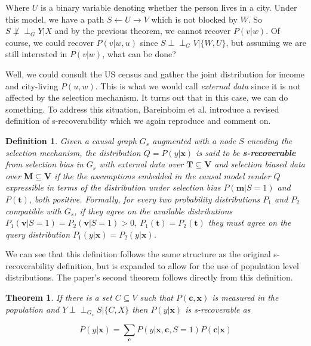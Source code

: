 \documentclass[12pt]{article}
\newtheorem{theorem}{Theorem}
\newtheorem{definition}{Definition}[section]
\theoremstyle{definition}
\newcommand{\dsep}{\perp \!\!\!\perp}
\begin{document}
Where $U$ is a binary variable denoting whether the person lives in a city. Under this model, we have a path $S \leftarrow U \rightarrow V$ which is not blocked by $W$. So $S \not \dsep_G Y | X$ and by the previous theorem, we cannot recover $P(v|w)$. Of course, we could recover $P(v | w, u)$ since $S \dsep_G V | \{W,U\}$, but assuming we are still interested in $P(v|w)$, what can be done? 

Well, we could consult the US census and gather the  joint distribution for income and city-living $P(u, w)$. This is what we would call \emph{external data} since it is not affected by the selection mechanism. It turns out that in this case, we can do something. To address this situation, Bareinboim et al.  introduce a revised definition  of s-recoverability which we again reproduce and comment on. 
 
\begin{definition}
Given a causal graph $G_s$ augmented with a node $S$ encoding the selection mechanism, the distribution $Q = P(y | \mathbf{x})$ is said to be \textbf{s-recoverable} from selection bias in $G_s$ with external data over $\mathbf{T} \subseteq \mathbf{V}$ and selection biased data over $\mathbf{M} \subseteq \mathbf{V}$ if the the assumptions embedded in the causal model render $Q$ expressible in terms of the distribution under selection bias $P(\mathbf{m} | S = 1)$ and $P(\mathbf{t})$, both positive. Formally, for every two probability distributions $P_1$ and $P_2$ compatible with $G_s$, if they agree on the available distributions $P_1(\mathbf{v} | S = 1) = P_2(\mathbf{v} | S = 1) > 0$, $P_1(\mathbf{t}) = P_2(\mathbf{t})$ they must agree on the query distribution $P_1(y | \mathbf{x}) = P_2(y | \mathbf{x})$.
\end{definition}

We can see that this definition follows the same structure as the original s-recoverability definition, but is expanded to allow for the use of population level distributions. The paper's second theorem follows directly from this definition.

\begin{theorem}
If there is a set $C \subseteq V$ such that $P(\mathbf{c}, \mathbf{x})$ is measured in the population and $Y \dsep_{G_s} S | \{C,X\}$ then $P(y | \mathbf{x})$ is s-recoverable as

$$P(y | \mathbf{x}) = \sum_{\mathbf{c}} P(y | \mathbf{x}, \mathbf{c}, S = 1)P(\mathbf{c} | \mathbf{x})$$
\end{theorem}
\end{document}
